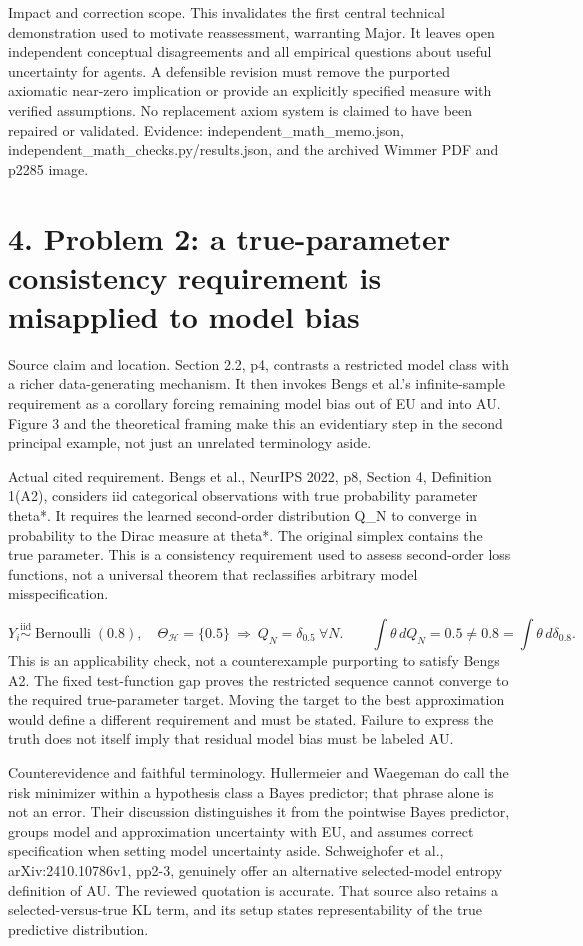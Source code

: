 \documentclass[10pt]{article}
\begin{document}
Impact and correction scope. This invalidates the first central technical demonstration used to motivate reassessment, warranting Major. It leaves open independent conceptual disagreements and all empirical questions about useful uncertainty for agents. A defensible revision must remove the purported axiomatic near-zero implication or provide an explicitly specified measure with verified assumptions. No replacement axiom system is claimed to have been repaired or validated. Evidence: independent\_math\_memo.json, independent\_math\_checks.py/results.json, and the archived Wimmer PDF and p2285 image.\par
\section*{4. Problem 2: a true-parameter consistency requirement is misapplied to model bias}
Source claim and location. Section 2.2, p4, contrasts a restricted model class with a richer data-generating mechanism. It then invokes Bengs et al.’s infinite-sample requirement as a corollary forcing remaining model bias out of EU and into AU. Figure 3 and the theoretical framing make this an evidentiary step in the second principal example, not just an unrelated terminology aside.\par
Actual cited requirement. Bengs et al., NeurIPS 2022, p8, Section 4, Definition 1(A2), considers iid categorical observations with true probability parameter theta*. It requires the learned second-order distribution Q\_N to converge in probability to the Dirac measure at theta*. The original simplex contains the true parameter. This is a consistency requirement used to assess second-order loss functions, not a universal theorem that reclassifies arbitrary model misspecification.\par
\[Y_i\overset{\mathrm{iid}}{\sim}\operatorname{Bernoulli}(0.8),\quad \Theta_{\mathcal H}=\{0.5\}\ \Longrightarrow\ Q_N=\delta_{0.5}\ \forall N.\qquad \int\theta\,dQ_N=0.5\ne0.8=\int\theta\,d\delta_{0.8}.\] This is an applicability check, not a counterexample purporting to satisfy Bengs A2. The fixed test-function gap proves the restricted sequence cannot converge to the required true-parameter target. Moving the target to the best approximation would define a different requirement and must be stated. Failure to express the truth does not itself imply that residual model bias must be labeled AU.\par
Counterevidence and faithful terminology. Hullermeier and Waegeman do call the risk minimizer within a hypothesis class a Bayes predictor; that phrase alone is not an error. Their discussion distinguishes it from the pointwise Bayes predictor, groups model and approximation uncertainty with EU, and assumes correct specification when setting model uncertainty aside. Schweighofer et al., arXiv:2410.10786v1, pp2-3, genuinely offer an alternative selected-model entropy definition of AU. The reviewed quotation is accurate. That source also retains a selected-versus-true KL term, and its setup states representability of the true predictive distribution.\par
\end{document}
